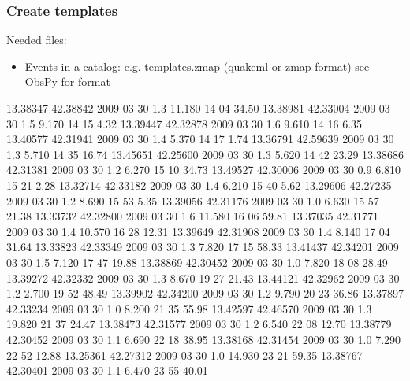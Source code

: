 \documentclass[a4paper,10pt,english]{sphinxmanual}
\begin{document}
\subsubsection{Create templates}
\label{\detokenize{sub/input.create_templates:create-templates}}\label{\detokenize{sub/input.create_templates::doc}}
Needed files:
\begin{itemize}
\item {} 
Events in a catalog: e.g. templates.zmap (quakeml or zmap format) see ObsPy for format

\end{itemize}
\begin{sphinxalltt}
13.38347        42.38842        2009    03      30      1.3     11.180  14      04      34.50
13.38981        42.33004        2009    03      30      1.5     9.170   14      15      4.32
13.39447        42.32878        2009    03      30      1.6     9.610   14      16      6.35
13.40577        42.31941        2009    03      30      1.4     5.370   14      17      1.74
13.36791        42.59639        2009    03      30      1.3     5.710   14      35      16.74
13.45651        42.25600        2009    03      30      1.3     5.620   14      42      23.29
13.38686        42.31381        2009    03      30      1.2     6.270   15      10      34.73
13.49527        42.30006        2009    03      30      0.9     6.810   15      21      2.28
13.32714        42.33182        2009    03      30      1.4     6.210   15      40      5.62
13.29606        42.27235        2009    03      30      1.2     8.690   15      53      5.35
13.39056        42.31176        2009    03      30      1.0     6.630   15      57      21.38
13.33732        42.32800        2009    03      30      1.6     11.580  16      06      59.81
13.37035        42.31771        2009    03      30      1.4     10.570  16      28      12.31
13.39649        42.31908        2009    03      30      1.4     8.140   17      04      31.64
13.33823        42.33349        2009    03      30      1.3     7.820   17      15      58.33
13.41437        42.34201        2009    03      30      1.5     7.120   17      47      19.88
13.38869        42.30452        2009    03      30      1.0     7.820   18      08      28.49
13.39272        42.32332        2009    03      30      1.3     8.670   19      27      21.43
13.44121        42.32962        2009    03      30      1.2     2.700   19      52      48.49
13.39902        42.34200        2009    03      30      1.2     9.790   20      23      36.86
13.37897        42.33234        2009    03      30      1.0     8.200   21      35      55.98
13.42597        42.46570        2009    03      30      1.3     19.820  21      37      24.47
13.38473        42.31577        2009    03      30      1.2     6.540   22      08      12.70
13.38779        42.30452        2009    03      30      1.1     6.690   22      18      38.95
13.38168        42.31454        2009    03      30      1.0     7.290   22      52      12.88
13.25361        42.27312        2009    03      30      1.0     14.930  23      21      59.35
13.38767        42.30401        2009    03      30      1.1     6.470   23      55      40.01

\end{sphinxalltt}
\end{document}
